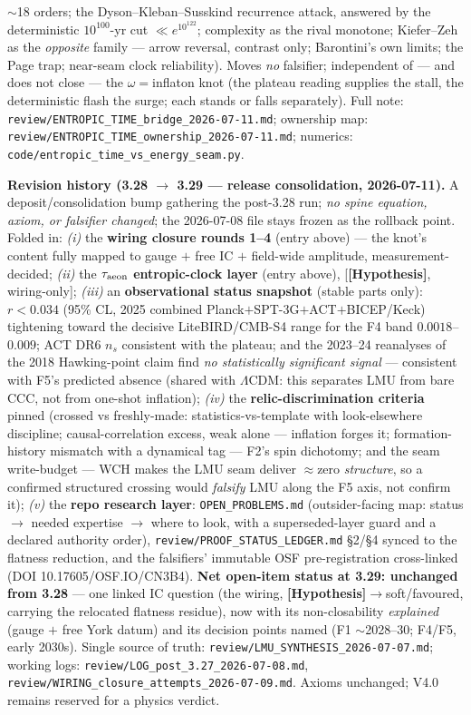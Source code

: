 \documentclass[11pt]{article}
\newcommand{\hyp}{\textcolor{orange!80!black}{\textbf{[Hypothesis]}}}
\begin{document}
{$\sim$18 orders; the Dyson--Kleban--Susskind recurrence attack, answered by the deterministic $10^{100}$-yr cut $\ll e^{10^{122}}$; complexity as the rival monotone; Kiefer--Zeh as the \emph{opposite} family --- arrow reversal, contrast only; Barontini's own limits; the Page trap; near-seam clock reliability). Moves \emph{no} falsifier; independent of --- and does not close --- the $\omega=$inflaton knot (the plateau reading supplies the stall, the deterministic flash the surge; each stands or falls separately). Full note: \texttt{review/ENTROPIC\_TIME\_bridge\_2026-07-11.md}; ownership map: \texttt{review/ENTROPIC\_TIME\_ownership\_2026-07-11.md}; numerics: \texttt{code/entropic\_time\_vs\_energy\_seam.py}.

\smallskip\noindent\textbf{Revision history (3.28 $\to$ 3.29 --- release consolidation, 2026-07-11).} A deposit/consolidation bump gathering the post-3.28 run; \emph{no spine equation, axiom, or falsifier changed}; the 2026-07-08 file stays frozen as the rollback point. Folded in: \emph{(i)} the \textbf{wiring closure rounds 1--4} (entry above) --- the knot's content fully mapped to gauge $+$ free IC $+$ field-wide amplitude, measurement-decided; \emph{(ii)} the \textbf{$\tau_{\rm aeon}$ entropic-clock layer} (entry above), [\hyp, wiring-only]; \emph{(iii)} an \textbf{observational status snapshot} (stable parts only): $r<0.034$ (95\% CL, 2025 combined Planck$+$SPT-3G$+$ACT$+$BICEP/Keck) tightening toward the decisive LiteBIRD/CMB-S4 range for the F4 band $0.0018$--$0.009$; ACT DR6 $n_s$ consistent with the plateau; and the 2023--24 reanalyses of the 2018 Hawking-point claim find \emph{no statistically significant signal} --- consistent with F5's predicted absence (shared with $\Lambda$CDM: this separates LMU from bare CCC, not from one-shot inflation); \emph{(iv)} the \textbf{relic-discrimination criteria} pinned (crossed vs freshly-made: statistics-vs-template with look-elsewhere discipline; causal-correlation excess, weak alone --- inflation forges it; formation-history mismatch with a dynamical tag --- F2's spin dichotomy; and the seam write-budget --- WCH makes the LMU seam deliver $\approx$zero \emph{structure}, so a confirmed structured crossing would \emph{falsify} LMU along the F5 axis, not confirm it); \emph{(v)} the \textbf{repo research layer}: \texttt{OPEN\_PROBLEMS.md} (outsider-facing map: status $\to$ needed expertise $\to$ where to look, with a superseded-layer guard and a declared authority order), \texttt{review/PROOF\_STATUS\_LEDGER.md} \S2/\S4 synced to the flatness reduction, and the falsifiers' immutable OSF pre-registration cross-linked (DOI 10.17605/OSF.IO/CN3B4). \textbf{Net open-item status at 3.29: unchanged from 3.28} --- one linked IC question (the wiring, \hyp$\to$soft/favoured, carrying the relocated flatness residue), now with its non-closability \emph{explained} (gauge $+$ free York datum) and its decision points named (F1 $\sim$2028--30; F4/F5, early 2030s). Single source of truth: \texttt{review/LMU\_SYNTHESIS\_2026-07-07.md}; working logs: \texttt{review/LOG\_post\_3.27\_2026-07-08.md}, \texttt{review/WIRING\_closure\_attempts\_2026-07-09.md}. Axioms unchanged; V4.0 remains reserved for a physics verdict.

}
\end{document}
